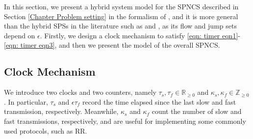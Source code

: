 In this section, we present a hybrid system model for the SPNCS described in Section \ref{Chapter Problem setting} in the formalism of \cite{gosate12}, and it is more general than the hybrid SPSs in the literature such as \cite{sanfelice2011singular} and \cite{wang2012analysis}, as its flow and jump sets depend on $\epsilon$.
%
Firstly, we design a clock mechanism to satisfy \eqref{eqn: timer eqn1}-\eqref{eqn: timer eqn3}, and then we present the model of the overall SPNCS.

\subsection{Clock Mechanism}
We introduce two clocks and two counters, namely $\tau_s, \tau_f \in \mathbb{R}_{\geq 0}$ and $\kappa_s, \kappa_f \in \mathbb{Z}_{\geq 0}$. In particular, $\tau_s$ and $\epsilon \tau_f$ record the time elapsed since the last slow and fast transmission, respectively.
Meanwhile, $\kappa_s$ and $\kappa_f$ count the number of slow and fast transmissions, respectively, and are useful for implementing some commonly used protocols, such as RR. 

